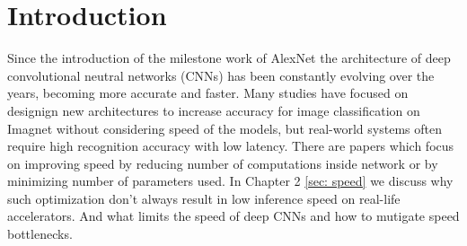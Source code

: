 

\chapter{Introduction}







Since the introduction of the milestone work of AlexNet \cite{krizhevsky2012_imagenet_alexnet} the architecture of deep convolutional neutral networks (CNNs) has been constantly evolving over the years, becoming more accurate and faster. Many studies have focused on designign new architectures to increase accuracy for image classification on Imagnet without considering speed of the models, but real-world systems often require high recognition accuracy with low latency. There are papers which focus on improving speed by reducing number of computations inside network or by minimizing number of parameters used. In Chapter 2 \ref{sec: speed} we discuss why such optimization don't always result in low inference speed on real-life accelerators. And what limits the speed of deep CNNs and how to mutigate speed bottlenecks.

